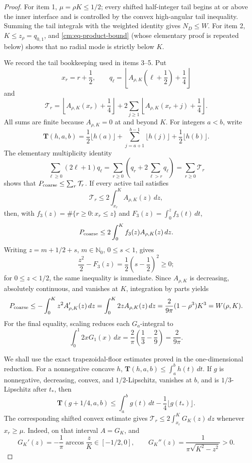 \documentclass[11pt]{article}
\numberwithin{equation}{section}
\theoremstyle{definition}
\theoremstyle{remark}
\begin{document}
\begin{proof}
For item 1, \(\mu=\rho K\leq1/2\); every shifted half-integer tail begins
at or above the inner interface and is controlled by the convex high-angular
tail inequality.  Summing the tail integrals with the weighted identity
gives \(N_D\leq W\).  For item 2,
\(K\leq z_\rho=q_{0,1}\), and
\eqref{cm:eq-product-bound} (whose elementary proof is repeated below)
shows that no radial mode is strictly below \(K\).

We record the tail bookkeeping used in items 3--5.  Put
\[
 x_r=r+\frac12,\qquad
 q_\ell=\left\lfloor A_{\rho,K}\!\left(\ell+\frac12\right)
                  +\frac14\right\rfloor
\]
and
\[
 \mathcal T_r=
 \left\lfloor A_{\rho,K}(x_r)+\frac14\right\rfloor
 +2\sum_{j\geq1}
 \left\lfloor A_{\rho,K}(x_r+j)+\frac14\right\rfloor .
\]
All sums are finite because \(A_{\rho,K}=0\) at and beyond \(K\).
For integers \(a<b\), write
\[
 \mathbf T(h,a,b)=\frac12\lfloor h(a)\rfloor
 +\sum_{j=a+1}^{b-1}\lfloor h(j)\rfloor
 +\frac12\lfloor h(b)\rfloor .
\]
The elementary multiplicity identity
\[
 \sum_{\ell\geq0}(2\ell+1)q_\ell
 =\sum_{r\geq0}\left(q_r+2\sum_{\ell>r}q_\ell\right)
 =\sum_{r\geq0}\mathcal T_r
\]
shows that \(P_{\rm coarse}\leq\sum_r\mathcal T_r\).  If every active
tail satisfies
\[
 \mathcal T_r\leq2\int_{x_r}^{K}A_{\rho,K}(z)\,dz,
\]
then, with
\(f_3(z)=\#\{r\geq0:x_r\leq z\}\) and
\(F_3(z)=\int_0^zf_3(t)\,dt\),
\[
 P_{\rm coarse}\leq2\int_0^K f_3(z)A_{\rho,K}(z)\,dz.
\]
Writing \(z=m+1/2+s\), \(m\in\mathbb N_0\), \(0\leq s<1\), gives
\[
 \frac{z^2}{2}-F_3(z)=\frac12\left(s-\frac12\right)^2\geq0;
\]
for \(0\leq z<1/2\), the same inequality is immediate.  Since
\(A_{\rho,K}\) is decreasing, absolutely continuous, and vanishes at
\(K\), integration by parts yields
\[
 P_{\rm coarse}
 \leq-\int_0^Kz^2A_{\rho,K}'(z)\,dz
 =\int_0^K2zA_{\rho,K}(z)\,dz
 =\frac{2}{9\pi}(1-\rho^3)K^3=W(\rho,K).
\]
For the final equality, scaling reduces each \(G_a\)-integral to
\[
 \int_0^1 2xG_1(x)\,dx
 =\frac2\pi\left(\frac13-\frac29\right)=\frac{2}{9\pi}.
\]

We shall use the exact trapezoidal-floor estimates proved in the
one-dimensional reduction.  For a nonnegative concave \(h\),
\(\mathbf T(h,a,b)\leq\int_a^bh(t)\,dt\).  If \(g\) is nonnegative,
decreasing, convex, and \(1/2\)-Lipschitz, vanishes at \(b\), and is
\(1/3\)-Lipschitz after \(t_*\), then
\[
 \mathbf T(g+1/4,a,b)
 \leq\int_a^bg(t)\,dt-\frac14\lfloor g(t_*)\rfloor.
\]
The corresponding shifted convex estimate gives
\(\mathcal T_r\leq2\int_{x_r}^KG_K(z)\,dz\) whenever \(x_r\geq\mu\).
Indeed, on that interval \(A=G_K\), and
\[
 G_K'(z)=-\frac1\pi\arccos\frac zK\in[-1/2,0],
 \qquad
 G_K''(z)=\frac1{\pi\sqrt{K^2-z^2}}>0.
\]


\end{proof}
\end{document}
